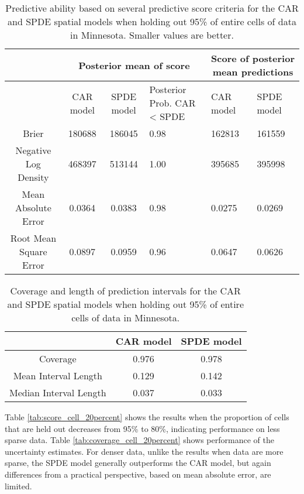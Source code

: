 \documentclass[12pt]{article}\usepackage[]{graphicx}\usepackage[]{color}
\providecommand{\tabularnewline}{\\}
\begin{document}
\begin{table}
\caption{Predictive ability based on several predictive score criteria for
the CAR and SPDE spatial models when holding out 95\% of entire cells
of data in Minnesota. Smaller values are better.}


\begin{tabular}{|c|c|c|>{\centering}p{3cm}|>{\centering}p{2.5cm}|>{\centering}p{2.5cm}|}
\hline 
 &
\multicolumn{3}{c|}{{\small{Posterior mean of score}}} &
\multicolumn{2}{c|}{{\small{Score of posterior mean predictions}}}\tabularnewline
\hline 
\hline 
 &
{\small{CAR model}} &
{\small{SPDE model}} &
{\small{Posterior Prob. CAR < SPDE}} &
{\small{CAR model}} &
{\small{SPDE model}}\tabularnewline
\hline 
{\small{Brier}} &
{\small{180688}} &
{\small{186045}} &
{\small{0.98}} &
{\small{162813}} &
{\small{161559}}\tabularnewline
\hline 
{\small{Negative Log Density}} &
{\small{468397}} &
{\small{513144}} &
{\small{1.00}} &
{\small{395685}} &
{\small{395998}}\tabularnewline
\hline 
{\small{Mean Absolute Error}} &
{\small{0.0364}} &
{\small{0.0383}} &
{\small{0.98}} &
{\small{0.0275}} &
{\small{0.0269}}\tabularnewline
\hline 
{\small{Root Mean Square Error}} &
{\small{0.0897}} &
{\small{0.0959}} &
{\small{0.96}} &
{\small{0.0647}} &
{\small{0.0626}}\tabularnewline
\hline 
\end{tabular}

\label{tab:score_cell_fivepercent}
\end{table}


\begin{table}
\caption{Coverage and length of prediction intervals for the CAR and SPDE spatial
models when holding out 95\% of entire cells of data in Minnesota. }


\begin{tabular}{|c|c|c|}
\hline 
 &
{\small{CAR model}} &
{\small{SPDE model}}\tabularnewline
\hline 
{\small{Coverage}} &
{\small{0.976}} &
{\small{0.978}}\tabularnewline
\hline 
{\small{Mean Interval Length}} &
{\small{0.129}} &
{\small{0.142}}\tabularnewline
\hline 
{\small{Median Interval Length}} &
{\small{0.037}} &
{\small{0.033}}\tabularnewline
\hline 
\end{tabular}

\label{tab:coverage_cell_fivepercent}
\end{table}




Table \ref{tab:score_cell_20percent} shows the results when the proportion
of cells that are held out decreases from 95\% to 80\%, indicating
performance on less sparse data. Table \ref{tab:coverage_cell_20percent}
shows performance of the uncertainty estimates. For denser data, unlike
the results when data are more sparse, the SPDE model generally outperforms
the CAR model, but again differences from a practical perspective,
based on mean absolute error, are limited.
\end{document}
